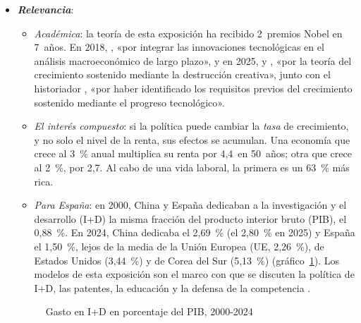 \documentclass[11pt]{article}
\begin{document}
\begin{itemize}
\item \textbf{\emph{Relevancia}}:
  \begin{itemize}
  \item \emph{Académica}: la teoría de esta exposición ha recibido 2~premios Nobel en 7~años. En 2018, , «por integrar las innovaciones tecnológicas en el análisis macroeconómico de largo plazo», y en 2025,  y , «por la teoría del crecimiento sostenido mediante la destrucción creativa», junto con el historiador , «por haber identificado los requisitos previos del crecimiento sostenido mediante el progreso tecnológico»\nocite{NobelPrize2018Romer,NobelPrize2025}.
  \item \emph{El interés compuesto}: si la política puede cambiar la \emph{tasa} de crecimiento, y no solo el nivel de la renta, sus efectos se acumulan. Una economía que crece al 3~\% anual multiplica su renta por 4,4~en 50~años; otra que crece al 2~\%, por 2,7. Al cabo de una vida laboral, la primera es un 63~\% más rica.
  \item \emph{Para España}: en 2000, China y España dedicaban a la investigación y el desarrollo (I+D) la misma fracción del producto interior bruto (PIB), el 0,88~\%. En 2024, China dedicaba el 2,69~\% (el 2,80~\% en 2025) y España el 1,50~\%, lejos de la media de la Unión Europea (UE, 2,26~\%), de Estados Unidos (3,44~\%) y de Corea del Sur (5,13~\%) (gráfico~\ref{fig:gasto-id-pib})\nocite{OCDE2026MSTI,Eurostat2026GERD,INE2025IMASD,ONEChina2026ID}. Los modelos de esta exposición son el marco con que se discuten la política de I+D, las patentes, la educación y la defensa de la competencia .
  \end{itemize}
  \begin{figure}[H]
  \centering
  \caption{Gasto en I+D en porcentaje del PIB, 2000-2024}\label{fig:gasto-id-pib}
  \end{figure}


\end{itemize}
\end{document}
